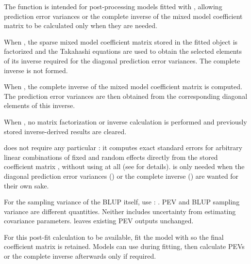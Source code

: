 \documentclass[a4paper]{book}
\begin{document}
\begin{Details}\relax
The function is intended for post-processing models fitted with , allowing prediction error variances or the complete inverse of the mixed model coefficient matrix to be calculated only when they are needed.

When , the sparse mixed model coefficient matrix stored in the fitted object is factorized and the Takahashi equations are used to obtain the selected elements of its inverse required for the diagonal prediction error variances. The complete inverse is not formed.

When , the complete inverse of the mixed model coefficient matrix is computed. The prediction error variances are then obtained from the corresponding diagonal elements of this inverse.

When , no matrix factorization or inverse calculation is performed and previously stored inverse-derived results are cleared.

 does not require any particular : it computes exact standard errors for arbitrary linear combinations of fixed and random effects directly from the stored coefficient matrix , without using  at all (see  for details).  is only needed when the diagonal prediction error variances () or the complete inverse () are wanted for their own sake.

For the sampling variance of the BLUP itself, use :
.
PEV and BLUP sampling variance are different quantities. Neither includes
uncertainty from estimating covariance parameters.  leaves
existing PEV outputs unchanged.

For this post-fit calculation to be available, fit the  model with
 so the
final coefficient matrix is retained. Models can use
 during fitting, then calculate PEVs or the
complete inverse afterwards only if required.
\end{Details}
%
\end{document}
